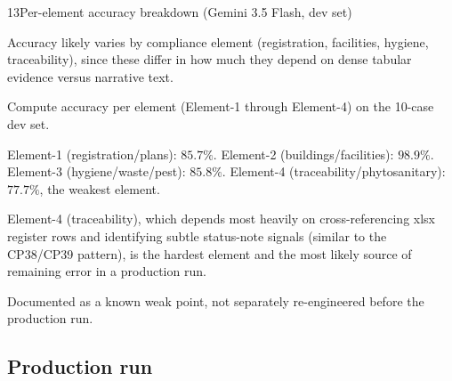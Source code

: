 \begin{explog}{13}{Per-element accuracy breakdown (Gemini 3.5 Flash, dev set)}
\item[Hypothesis] Accuracy likely varies by compliance element (registration, facilities, hygiene, traceability), since these differ in how much they depend on dense tabular evidence versus narrative text.
\item[Method] Compute accuracy per element (Element-1 through Element-4) on the 10-case dev set.
\item[Result] Element-1 (registration/plans): $85.7\%$. Element-2 (buildings/facilities): $98.9\%$. Element-3 (hygiene/waste/pest): $85.8\%$. Element-4 (traceability/phytosanitary): $77.7\%$, the weakest element.
\item[Inference] Element-4 (traceability), which depends most heavily on cross-referencing xlsx register rows and identifying subtle status-note signals (similar to the CP38/CP39 pattern), is the hardest element and the most likely source of remaining error in a production run.
\item[Verdict] Documented as a known weak point, not separately re-engineered before the production run.
\end{explog}


\subsection{Production run}

